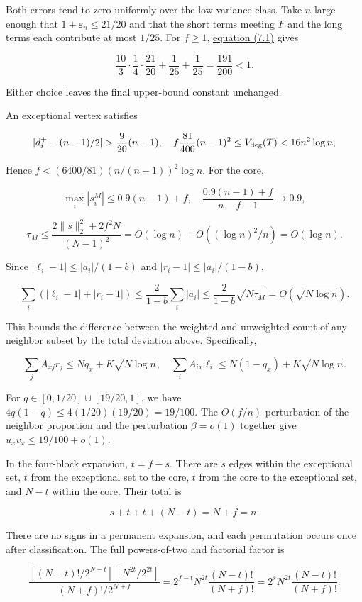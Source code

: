 \documentclass[11pt,a4paper]{article}
\begin{document}
Both errors tend to zero uniformly over the low-variance class. Take \(n\) large enough that \(1+\varepsilon_n\le21/20\) and that the short terms meeting \(F\) and the long terms each contribute at most \(1/25\). For \(f\ge1\), \hyperref[eq-exceptional-bound]{equation (7.1)} gives

\[
\frac{10}{3}\cdot\frac14\cdot\frac{21}{20}+\frac1{25}+\frac1{25}
=\frac{191}{200}<1.
\]

Either choice leaves the final upper-bound constant unchanged.

An exceptional vertex satisfies

\[
|d_i^+-(n-1)/2|>\frac9{20}(n-1),\quad
f\frac{81}{400}(n-1)^2\le V_{\rm deg}(T)<16n^2\log n,
\]

Hence \(f<(6400/81)(n/(n-1))^2\log n\). For the core,

\[
\max_i|s_i^M|\le0.9(n-1)+f,
\quad \frac{0.9(n-1)+f}{n-f-1}\longrightarrow0.9,
\]

\[
\tau_M\le\frac{2\|s\|_2^2+2f^2N}{(N-1)^2}
=O(\log n)+O((\log n)^2/n)=O(\log n).
\]

Since \(|\ell_i-1|\le|a_i|/(1-b)\) and \(|r_i-1|\le|a_i|/(1-b)\),

\[
\sum_i(|\ell_i-1|+|r_i-1|)
\le\frac2{1-b}\sum_i|a_i|
\le\frac2{1-b}\sqrt{N\tau_M}=O(\sqrt{N\log n}).
\]

This bounds the difference between the weighted and unweighted count of any neighbor subset by the total deviation above. Specifically,

\[
\sum_jA_{xj}r_j\le Nq_x+K\sqrt{N\log n},\quad
\sum_iA_{ix}\ell_i\le N(1-q_x)+K\sqrt{N\log n}.
\]

For \(q\in[0,1/20]\cup[19/20,1]\), we have \(4q(1-q)\le4(1/20)(19/20)=19/100\). The \(O(f/n)\) perturbation of the neighbor proportion and the perturbation \(\beta=o(1)\) together give \(u_xv_x\le19/100+o(1)\).

In the four-block expansion, \(t=f-s\). There are \(s\) edges within the exceptional set, \(t\) from the exceptional set to the core, \(t\) from the core to the exceptional set, and \(N-t\) within the core. Their total is

\[
s+t+t+(N-t)=N+f=n.
\]

There are no signs in a permanent expansion, and each permutation occurs once after classification. The full powers-of-two and factorial factor is

\[
\frac{[(N-t)!/2^{N-t}]\,[N^{2t}/2^{2t}]}{(N+f)!/2^{N+f}}
=2^{f-t}N^{2t}\frac{(N-t)!}{(N+f)!}
=2^sN^{2t}\frac{(N-t)!}{(N+f)!}.
\]
\end{document}
